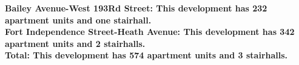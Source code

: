 \bf{Bailey Avenue-West 193Rd Street}: This development has 232 apartment units and one stairhall.\\\bf{Fort Independence Street-Heath Avenue}: This development has 342 apartment units and 2 stairhalls.\\\bf{Total}: This development has 574 apartment units and 3 stairhalls.\\